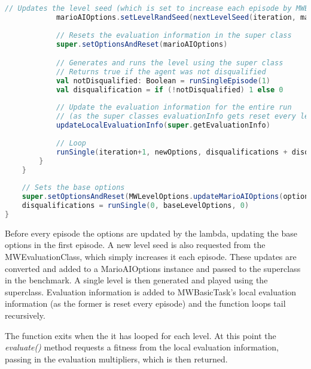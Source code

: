 \begin{minipage}{0.9\linewidth}
\centering
\begin{lstlisting}[language=scala]    
            // Updates the level seed (which is set to increase each episode by MWEvaluationClass)
            marioAIOptions.setLevelRandSeed(nextLevelSeed(iteration, marioAIOptions.getLevelRandSeed))
            
            // Resets the evaluation information in the super class
            super.setOptionsAndReset(marioAIOptions)

            // Generates and runs the level using the super class
            // Returns true if the agent was not disqualified
            val notDisqualified: Boolean = runSingleEpisode(1)
            val disqualification = if (!notDisqualified) 1 else 0
       
            // Update the evaluation information for the entire run
            // (as the super classes evaluationInfo gets reset every level
            updateLocalEvaluationInfo(super.getEvaluationInfo)
            
            // Loop
            runSingle(iteration+1, newOptions, disqualifications + disqualified)
        }
    }
    
    // Sets the base options
    super.setOptionsAndReset(MWLevelOptions.updateMarioAIOptions(options, baseLevelOptions))
    disqualifications = runSingle(0, baseLevelOptions, 0)
}
\end{lstlisting}
\end{minipage}


Before every episode the options are updated by the lambda, updating the base options in the first episode. A new level seed is also requested from the MWEvaluationClass, which simply increases it each episode. These updates are converted and added to a MarioAIOptions instance and passed to the superclass in the benchmark. A single level is then generated and played using the superclass. Evaluation information is added to MWBasicTask's local evaluation information (as the former is reset every episode) and the function loops tail recursively.

The function exits when the it has looped for each level. At this point the \emph{evaluate()} method requests a fitness from the local evaluation information, passing in the evaluation multipliers, which is then returned.


